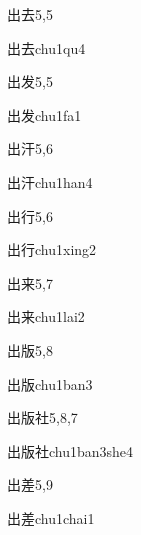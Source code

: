 \begin{entry}{出去}{5,5}
  \begin{phonetics}{出去}{chu1qu4}
  \end{phonetics}
\end{entry}

\begin{entry}{出发}{5,5}
  \begin{phonetics}{出发}{chu1fa1}
  \end{phonetics}
\end{entry}

\begin{entry}{出汗}{5,6}
  \begin{phonetics}{出汗}{chu1han4}
  \end{phonetics}
\end{entry}

\begin{entry}{出行}{5,6}
  \begin{phonetics}{出行}{chu1xing2}
  \end{phonetics}
\end{entry}

\begin{entry}{出来}{5,7}
  \begin{phonetics}{出来}{chu1lai2}
  \end{phonetics}
\end{entry}

\begin{entry}{出版}{5,8}
  \begin{phonetics}{出版}{chu1ban3}
  \end{phonetics}
\end{entry}

\begin{entry}{出版社}{5,8,7}
  \begin{phonetics}{出版社}{chu1ban3she4}
  \end{phonetics}
\end{entry}

\begin{entry}{出差}{5,9}
  \begin{phonetics}{出差}{chu1chai1}
  \end{phonetics}
\end{entry}

